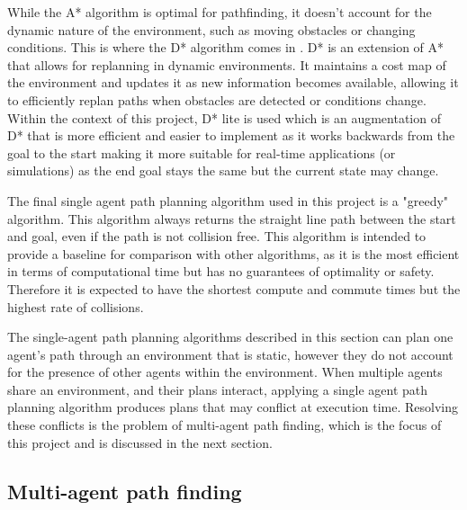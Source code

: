 While the A* algorithm is optimal for pathfinding, it doesn't account for the dynamic nature of the environment, such as moving obstacles or changing conditions. This is where the D* algorithm comes in \cite{stentz1994dstar}. D* is an extension of A* that allows for replanning in dynamic environments. It maintains a cost map of the environment and updates it as new information becomes available, allowing it to efficiently replan paths when obstacles are detected or conditions change. Within the context of this project, D* lite is used which is an augmentation of D* that is more efficient and easier to implement \cite{koenig2002dstarlite} as it works backwards from the goal to the start making it more suitable for real-time applications (or simulations) as the end goal stays the same but the current state may change. \par

\vspace{1em}

The final single agent path planning algorithm used in this project is a "greedy" algorithm. This algorithm always returns the straight line path between the start and goal, even if the path is not collision free. This algorithm is intended to provide a baseline for comparison with other algorithms, as it is the most efficient in terms of computational time but has no guarantees of optimality or safety. Therefore it is expected to have the shortest compute and commute times but the highest rate of collisions.\par

\vspace{1em}

The single-agent path planning algorithms described in this section can plan one agent's path through an environment that is static, however they do not account for the presence of other agents within the environment. When multiple agents share an environment, and their plans interact, applying a single agent path planning algorithm produces plans that may conflict at execution time. Resolving these conflicts is the problem of multi-agent path finding, which is the focus of this project and is discussed in the next section. \par

\vspace{1em}

\subsection{Multi-agent path finding}
\label{sec:mapf}

